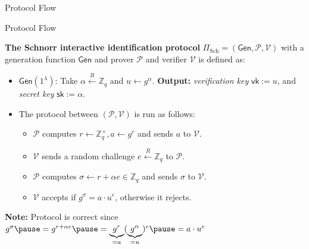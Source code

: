 \documentclass[xcolor={usenames,dvipsnames}]{beamer}
\begin{document}
\begin{frame}{Protocol Flow}
\begin{figure}[H]
    
        \label{fig:interactive_schnorr}
        \end{figure}
    \end{frame}

    \begin{frame}{Protocol Flow}
        \begin{definition}
            \textbf{The Schnorr interactive identification protocol} $\Pi_{\text{Sch}} = (\mathsf{Gen}, \mathcal{P}, \mathcal{V})$ with a generation function $\mathsf{Gen}$ and prover $\mathcal{P}$ and verifier $\mathcal{V}$ is defined as:
            \begin{itemize}
                \item $\mathsf{Gen}(1^{\lambda})$: Take $\alpha \xleftarrow{R} \mathbb{Z}_q$ and $u \gets g^{\alpha}$. \textbf{Output:} \textit{verification key} $\mathsf{vk} := u$, and \textit{secret key} $\mathsf{sk} := \alpha$. \pause
                \item The protocol between $(\mathcal{P},\mathcal{V})$ is run as follows:
                \begin{itemize}
                    \item $\mathcal{P}$ computes $r \gets \mathbb{Z}_q^{\times}, a \gets g^{r}$ and sends $a$ to $\mathcal{V}$.\pause
                    \item $\mathcal{V}$ sends a random challenge $e \xleftarrow{R} \mathbb{Z}_q$ to $\mathcal{P}$.\pause
                    \item $\mathcal{P}$ computes $\sigma \gets r + \alpha e \in \mathbb{Z}_q$ and sends $\sigma$ to $\mathcal{V}$.\pause
                    \item $\mathcal{V}$ accepts if $g^{\sigma} = a \cdot u^e$, otherwise it rejects.\pause
                \end{itemize}
            \end{itemize}
        \end{definition}

        \textbf{Note:} Protocol is correct since $g^{\sigma}\pause =g^{r+\alpha e}\pause = \underbrace{g^r}_{=a}(\underbrace{g^{\alpha}}_{=u})^e\pause = a\cdot u^e$
    \end{frame}
\end{document}
